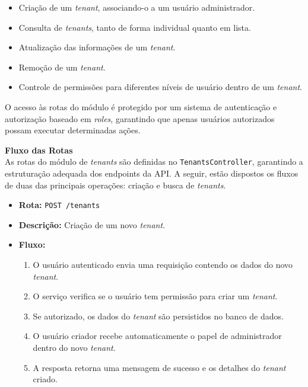 \begin{itemize}
    \item Criação de um \textit{tenant}, associando-o a um usuário administrador.
    \item Consulta de \textit{tenants}, tanto de forma individual quanto em lista.
    \item Atualização das informações de um \textit{tenant}.
    \item Remoção de um \textit{tenant}.
    \item Controle de permissões para diferentes níveis de usuário dentro de um \textit{tenant}.
\end{itemize}

O acesso às rotas do módulo é protegido por um sistema de autenticação e autorização baseado em \textit{roles}, garantindo que apenas usuários autorizados possam executar determinadas ações.

\textbf{Fluxo das Rotas} \\
As rotas do módulo de \textit{tenants} são definidas no \texttt{TenantsController}, garantindo a estruturação adequada dos endpoints da API. A seguir, estão dispostos os fluxos de duas das principais operações: criação e busca de \textit{tenants}.

\begin{itemize}
	\item \textbf{Rota:} \texttt{POST /tenants}
	\item \textbf{Descrição:} Criação de um novo \textit{tenant}.
	\item \textbf{Fluxo:}
	\begin{enumerate}
    \item O usuário autenticado envia uma requisição contendo os dados do novo \textit{tenant}.
    \item O serviço verifica se o usuário tem permissão para criar um \textit{tenant}.
    \item Se autorizado, os dados do \textit{tenant} são persistidos no banco de dados.
    \item O usuário criador recebe automaticamente o papel de administrador dentro do novo \textit{tenant}.
    \item A resposta retorna uma mensagem de sucesso e os detalhes do \textit{tenant} criado.
	\end{enumerate}
\end{itemize}

